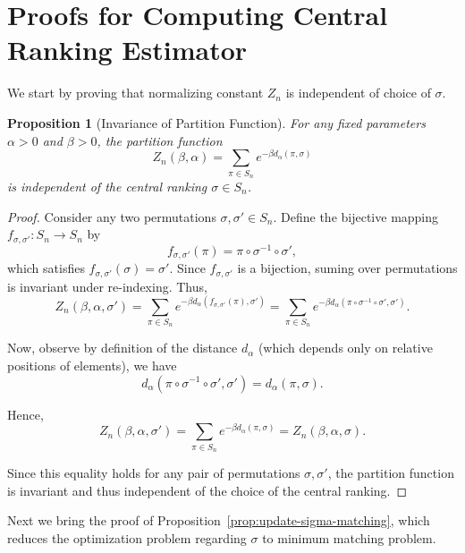 \documentclass{article}
\newtheorem{proposition}[theorem]{Proposition} %
\begin{document}
\section{Proofs for Computing Central Ranking Estimator}\label{sec: proof-matching}
We start by proving that normalizing constant $Z_n$ is independent of choice of $\sigma$.
\begin{proposition}[Invariance of Partition Function]\label{lem:Zn-indep-sigma}
For any fixed parameters \(\alpha > 0\) and \(\beta > 0\), the partition function 
\[
Z_n(\beta,\alpha) = \sum_{\pi \in S_n} e^{-\beta d_\alpha(\pi,\sigma)}
\]
is independent of the central ranking \(\sigma \in S_n\).
\end{proposition}
\begin{proof}
Consider any two permutations \(\sigma, \sigma' \in S_n\). 
Define the bijective mapping \(f_{\sigma,\sigma'}:S_n\to S_n\) by
\[
f_{\sigma,\sigma'}(\pi) = \pi \circ \sigma^{-1}\circ\sigma',
\]
which satisfies \(f_{\sigma,\sigma'}(\sigma) = \sigma'\). Since \(f_{\sigma,\sigma'}\) is a bijection, suming over permutations is invariant under re-indexing. Thus,
\[
Z_n(\beta,\alpha,\sigma') 
= \sum_{\pi \in S_n} e^{-\beta d_\alpha(f_{\sigma,\sigma'}(\pi),\sigma')}
= \sum_{\pi \in S_n} e^{-\beta d_\alpha(\pi\circ \sigma^{-1}\circ\sigma',\sigma')}.
\]

Now, observe by definition of the distance \(d_\alpha\) (which depends only on relative positions of elements), we have
\[
d_\alpha(\pi\circ \sigma^{-1}\circ\sigma',\sigma') = d_\alpha(\pi,\sigma).
\]

Hence,
\[
Z_n(\beta,\alpha,\sigma') 
= \sum_{\pi \in S_n} e^{-\beta d_\alpha(\pi,\sigma)}
= Z_n(\beta,\alpha,\sigma).
\]

Since this equality holds for any pair of permutations \(\sigma,\sigma'\), the partition function is invariant and thus independent of the choice of the central ranking.
\end{proof}
Next we bring the proof of Proposition~\ref{prop:update-sigma-matching}, which reduces the optimization problem regarding $\sigma$ to minimum matching problem.
\end{document}
